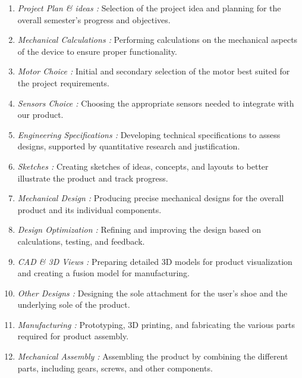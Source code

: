 \documentclass[lettersize,journal]{IEEEtran}
\begin{document}
\begin{enumerate}
    \item \textit{Project Plan \& ideas :} Selection of the project idea and planning for the overall semester’s progress and objectives.

    \item \textit{Mechanical Calculations :} Performing calculations on the mechanical aspects of the device to ensure proper functionality.
    
    \item \textit{Motor Choice :} Initial and secondary selection of the motor best suited for the project requirements.
    
    \item \textit{Sensors Choice :} Choosing the appropriate sensors needed to integrate with our product.
    
    \item \textit{Engineering Specifications :} Developing technical specifications to assess designs, supported by quantitative research and justification.

    \item \textit{Sketches :} Creating sketches of ideas, concepts, and layouts to better illustrate the product and track progress.

    \item \textit{Mechanical Design :} Producing precise mechanical designs for the overall product and its individual components.

    \item \textit{Design Optimization :} Refining and improving the design based on calculations, testing, and feedback.

    \item \textit{CAD \& 3D Views :} Preparing detailed 3D models for product visualization and creating a fusion model for manufacturing.

    \item \textit{Other Designs :} Designing the sole attachment for the user’s shoe and the underlying sole of the product.
    
    \item \textit{Manufacturing :} Prototyping, 3D printing, and fabricating the various parts required for product assembly.

    \item \textit{Mechanical Assembly :} Assembling the product by combining the different parts, including gears, screws, and other components.


\end{enumerate}
\end{document}
